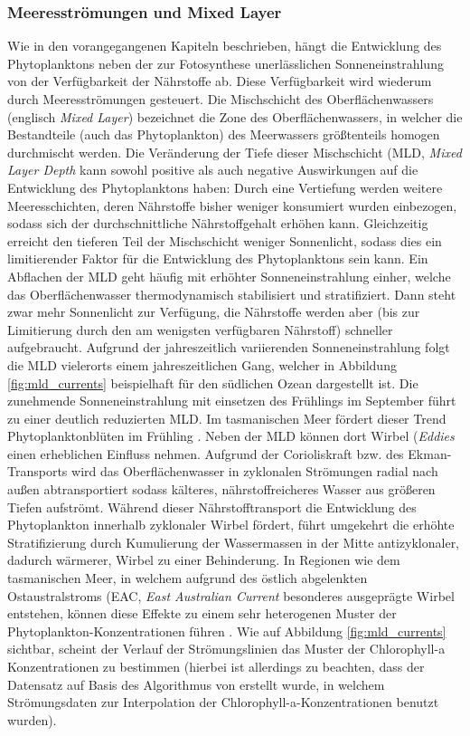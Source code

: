 \documentclass[12pt,a4paper,onecolumn,draft]{scrartcl}
\begin{document}
\subsubsection{Meeresströmungen und Mixed Layer}
Wie in den vorangegangenen Kapiteln beschrieben, hängt die Entwicklung des Phytoplanktons neben der zur Fotosynthese unerlässlichen Sonneneinstrahlung von der Verfügbarkeit der Nährstoffe ab. Diese Verfügbarkeit wird wiederum durch Meeresströmungen gesteuert. Die Mischschicht des Oberflächenwassers (englisch \textit{Mixed Layer}) bezeichnet die Zone des Oberflächenwassers, in welcher die Bestandteile (auch das Phytoplankton) des Meerwassers größtenteils homogen durchmischt werden. Die Veränderung der Tiefe dieser Mischschicht (MLD, \textit{Mixed Layer Depth} kann sowohl positive als auch negative Auswirkungen auf die Entwicklung des Phytoplanktons haben: Durch eine Vertiefung werden weitere Meeresschichten, deren Nährstoffe bisher weniger konsumiert wurden einbezogen, sodass sich der durchschnittliche Nährstoffgehalt erhöhen kann. Gleichzeitig erreicht den tieferen Teil der Mischschicht weniger Sonnenlicht, sodass dies ein limitierender Faktor für die Entwicklung des Phytoplanktons sein kann. Ein Abflachen der MLD geht häufig mit erhöhter Sonneneinstrahlung einher, welche das Oberflächenwasser thermodynamisch stabilisiert und stratifiziert. Dann steht zwar mehr Sonnenlicht zur Verfügung, die Nährstoffe werden aber (bis zur Limitierung durch den am wenigsten verfügbaren Nährstoff) schneller aufgebraucht. Aufgrund der jahreszeitlich variierenden Sonneneinstrahlung folgt die MLD vielerorts einem jahreszeitlichen Gang, welcher in Abbildung \ref{fig:mld_currents} beispielhaft für den südlichen Ozean dargestellt ist. Die zunehmende Sonneneinstrahlung mit einsetzen des Frühlings im September führt zu einer deutlich reduzierten MLD. Im tasmanischen Meer fördert dieser Trend Phytoplanktonblüten im Frühling \citep{Tilburg.2002}. Neben der MLD können dort Wirbel (\textit{Eddies} einen erheblichen Einfluss nehmen. Aufgrund der Corioliskraft bzw. des Ekman-Transports wird das Oberflächenwasser in zyklonalen Strömungen radial nach außen abtransportiert sodass kälteres, nährstoffreicheres Wasser aus größeren Tiefen aufströmt. Während dieser Nährstofftransport die Entwicklung des Phytoplankton innerhalb zyklonaler Wirbel fördert, führt umgekehrt die erhöhte Stratifizierung durch Kumulierung der Wassermassen in der Mitte antizyklonaler, dadurch wärmerer, Wirbel zu einer Behinderung. In Regionen wie dem tasmanischen Meer, in welchem aufgrund des östlich abgelenkten Ostaustralstroms (EAC, \textit{East Australian Current} besonderes ausgeprägte Wirbel entstehen, können diese Effekte zu einem sehr heterogenen Muster der Phytoplankton-Konzentrationen führen \citep{Tilburg.2002}. Wie auf Abbildung \ref{fig:mld_currents} sichtbar, scheint der Verlauf der Strömungslinien das Muster der Chlorophyll-a Konzentrationen zu bestimmen (hierbei ist allerdings zu beachten, dass der Datensatz auf Basis des Algorithmus von \citet{Saulquin.2019} erstellt wurde, in welchem Strömungsdaten zur Interpolation der Chlorophyll-a-Konzentrationen benutzt wurden).
\end{document}
